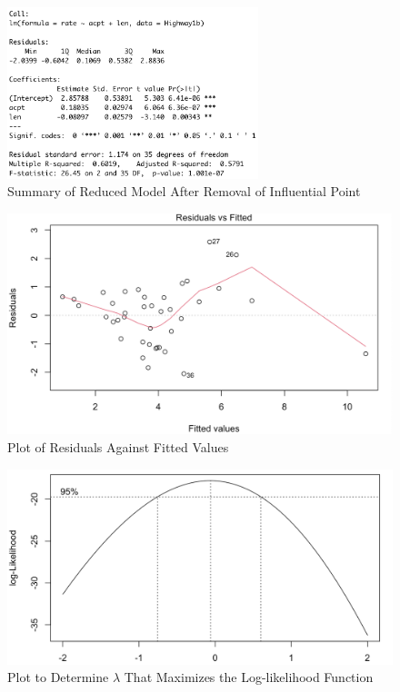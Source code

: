 \documentclass[12pt]{report}
\begin{document}
\begin{figure}[H]
    \centering
    \includegraphics[width=0.65\textwidth]{Diagnostics/Reduced model 2.png}
    \caption{Summary of Reduced Model After Removal of Influential Point} \label{fig:DC2}
\end{figure}
\noindent

\begin{figure}[H]
    \centering
    \includegraphics[width=1\textwidth]{Adequacy tests/Residual plot.png}
    \caption{Plot of Residuals Against Fitted Values} \label{fig:AT1}
\end{figure}
\noindent

\begin{figure}[H]
    \centering
    \includegraphics[width=1\textwidth]{Adequacy tests/Boxcox.png}
    \caption{Plot to Determine $\lambda$ That Maximizes the Log-likelihood Function} \label{fig:AT2}
\end{figure}
\noindent
\end{document}
